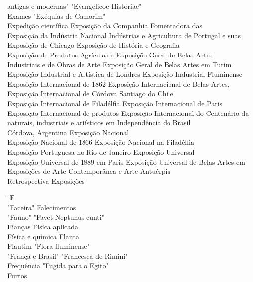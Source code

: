 \begin{tabbing}
	antigas e modernas" \> "Evangelicoe Historiae"\\ 
	Exames \>  "Exéquias de Camorim"\\ 
	Expedição científica \> Exposição da Companhia Fomentadora das\\ 
	Exposição da Indústria Nacional \> Indústrias e Agricultura de Portugal e suas\\
	Exposição de Chicago \> Exposição de História e Geografia \\	
	Exposição de Produtos Agrículas e \> Exposição Geral de Belas Artes\\ 
	Industriais e de Obras de Arte \> Exposição Geral de Belas Artes em Turim\\
	Exposição Industrial e Artística de Londres \> Exposição Industrial Fluminense \\
	Exposição Internacional de 1862 \> Exposição Internacional de Belas Artes,\\ 
	Exposição Internacional de Córdova \> Santiago do Chile\\
	Exposição Internacional de Filadélfia \> Exposição Internacional de Paris \\		
	Exposição Internacional de produtos	\> Exposição Internacional do Centenário da\\
	naturais, industriais e artísticos em \> Independência do Brasil\\
	Córdova, Argentina \> Exposição Nacional\\ 
	Exposição Nacional de 1866 \> Exposição Nacional na Filadélfia\\
	Exposição Portuguesa no Rio de Janeiro \> Exposição Universal \\		
	Exposição Universal de 1889 em Paris	\> Exposição Universal de Belas Artes em\\
	Exposições de Arte Contemporânea e Arte \> Antuérpia\\
	Retrospectiva \> Exposições\\	   	   	   	   
\end{tabbing}

\begin{tabbing}
	\hspace{8,7cm}\=\hspace{1cm}\=\kill
	\textbf{F} \>  \\ 
	"Faceira"	\> Falecimentos\\
	"Fauno" \> "Favet Neptunus cunti"\\
	Fianças \> Física aplicada\\
	Física e química \> Flauta\\ 
	Flautim \>  "Flora fluminense"\\ 
	"França e Brasil" \> "Francesca de Rimini"\\ 
	Frequência \> "Fugida para o Egito"\\
	Furtos \>  \\		   	   
\end{tabbing}

